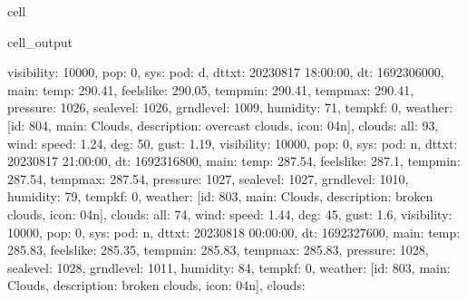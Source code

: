 \documentclass[letterpaper,10pt,english]{jupyterBook}
\begin{document}
\begin{sphinxuseclass}{cell}
\begin{sphinxVerbatimOutput}
\begin{sphinxuseclass}{cell_output}
\begin{sphinxVerbatim}[commandchars=\\\{\}]
\PYGZsq{}visibility\PYGZsq{}: 10000, \PYGZsq{}pop\PYGZsq{}: 0, \PYGZsq{}sys\PYGZsq{}: \PYGZob{}\PYGZsq{}pod\PYGZsq{}: \PYGZsq{}d\PYGZsq{}\PYGZcb{}, \PYGZsq{}dt\PYGZus{}txt\PYGZsq{}: \PYGZsq{}2023\PYGZhy{}08\PYGZhy{}17 18:00:00\PYGZsq{}\PYGZcb{}, \PYGZob{}\PYGZsq{}dt\PYGZsq{}: 1692306000, \PYGZsq{}main\PYGZsq{}: \PYGZob{}\PYGZsq{}temp\PYGZsq{}: 290.41, \PYGZsq{}feels\PYGZus{}like\PYGZsq{}: 290.05, \PYGZsq{}temp\PYGZus{}min\PYGZsq{}: 290.41, \PYGZsq{}temp\PYGZus{}max\PYGZsq{}: 290.41, \PYGZsq{}pressure\PYGZsq{}: 1026, \PYGZsq{}sea\PYGZus{}level\PYGZsq{}: 1026, \PYGZsq{}grnd\PYGZus{}level\PYGZsq{}: 1009, \PYGZsq{}humidity\PYGZsq{}: 71, \PYGZsq{}temp\PYGZus{}kf\PYGZsq{}: 0\PYGZcb{}, \PYGZsq{}weather\PYGZsq{}: [\PYGZob{}\PYGZsq{}id\PYGZsq{}: 804, \PYGZsq{}main\PYGZsq{}: \PYGZsq{}Clouds\PYGZsq{}, \PYGZsq{}description\PYGZsq{}: \PYGZsq{}overcast clouds\PYGZsq{}, \PYGZsq{}icon\PYGZsq{}: \PYGZsq{}04n\PYGZsq{}\PYGZcb{}], \PYGZsq{}clouds\PYGZsq{}: \PYGZob{}\PYGZsq{}all\PYGZsq{}: 93\PYGZcb{}, \PYGZsq{}wind\PYGZsq{}: \PYGZob{}\PYGZsq{}speed\PYGZsq{}: 1.24, \PYGZsq{}deg\PYGZsq{}: 50, \PYGZsq{}gust\PYGZsq{}: 1.19\PYGZcb{}, \PYGZsq{}visibility\PYGZsq{}: 10000, \PYGZsq{}pop\PYGZsq{}: 0, \PYGZsq{}sys\PYGZsq{}: \PYGZob{}\PYGZsq{}pod\PYGZsq{}: \PYGZsq{}n\PYGZsq{}\PYGZcb{}, \PYGZsq{}dt\PYGZus{}txt\PYGZsq{}: \PYGZsq{}2023\PYGZhy{}08\PYGZhy{}17 21:00:00\PYGZsq{}\PYGZcb{}, \PYGZob{}\PYGZsq{}dt\PYGZsq{}: 1692316800, \PYGZsq{}main\PYGZsq{}: \PYGZob{}\PYGZsq{}temp\PYGZsq{}: 287.54, \PYGZsq{}feels\PYGZus{}like\PYGZsq{}: 287.1, \PYGZsq{}temp\PYGZus{}min\PYGZsq{}: 287.54, \PYGZsq{}temp\PYGZus{}max\PYGZsq{}: 287.54, \PYGZsq{}pressure\PYGZsq{}: 1027, \PYGZsq{}sea\PYGZus{}level\PYGZsq{}: 1027, \PYGZsq{}grnd\PYGZus{}level\PYGZsq{}: 1010, \PYGZsq{}humidity\PYGZsq{}: 79, \PYGZsq{}temp\PYGZus{}kf\PYGZsq{}: 0\PYGZcb{}, \PYGZsq{}weather\PYGZsq{}: [\PYGZob{}\PYGZsq{}id\PYGZsq{}: 803, \PYGZsq{}main\PYGZsq{}: \PYGZsq{}Clouds\PYGZsq{}, \PYGZsq{}description\PYGZsq{}: \PYGZsq{}broken clouds\PYGZsq{}, \PYGZsq{}icon\PYGZsq{}: \PYGZsq{}04n\PYGZsq{}\PYGZcb{}], \PYGZsq{}clouds\PYGZsq{}: \PYGZob{}\PYGZsq{}all\PYGZsq{}: 74\PYGZcb{}, \PYGZsq{}wind\PYGZsq{}: \PYGZob{}\PYGZsq{}speed\PYGZsq{}: 1.44, \PYGZsq{}deg\PYGZsq{}: 45, \PYGZsq{}gust\PYGZsq{}: 1.6\PYGZcb{}, \PYGZsq{}visibility\PYGZsq{}: 10000, \PYGZsq{}pop\PYGZsq{}: 0, \PYGZsq{}sys\PYGZsq{}: \PYGZob{}\PYGZsq{}pod\PYGZsq{}: \PYGZsq{}n\PYGZsq{}\PYGZcb{}, \PYGZsq{}dt\PYGZus{}txt\PYGZsq{}: \PYGZsq{}2023\PYGZhy{}08\PYGZhy{}18 00:00:00\PYGZsq{}\PYGZcb{}, \PYGZob{}\PYGZsq{}dt\PYGZsq{}: 1692327600, \PYGZsq{}main\PYGZsq{}: \PYGZob{}\PYGZsq{}temp\PYGZsq{}: 285.83, \PYGZsq{}feels\PYGZus{}like\PYGZsq{}: 285.35, \PYGZsq{}temp\PYGZus{}min\PYGZsq{}: 285.83, \PYGZsq{}temp\PYGZus{}max\PYGZsq{}: 285.83, \PYGZsq{}pressure\PYGZsq{}: 1028, \PYGZsq{}sea\PYGZus{}level\PYGZsq{}: 1028, \PYGZsq{}grnd\PYGZus{}level\PYGZsq{}: 1011, \PYGZsq{}humidity\PYGZsq{}: 84, \PYGZsq{}temp\PYGZus{}kf\PYGZsq{}: 0\PYGZcb{}, \PYGZsq{}weather\PYGZsq{}: [\PYGZob{}\PYGZsq{}id\PYGZsq{}: 803, \PYGZsq{}main\PYGZsq{}: \PYGZsq{}Clouds\PYGZsq{}, \PYGZsq{}description\PYGZsq{}: \PYGZsq{}broken clouds\PYGZsq{}, \PYGZsq{}icon\PYGZsq{}: \PYGZsq{}04n\PYGZsq{}\PYGZcb{}], \PYGZsq{}clouds\PYGZsq{}: 
\end{sphinxVerbatim}
\end{sphinxuseclass}
\end{sphinxVerbatimOutput}
\end{sphinxuseclass}
\end{document}
